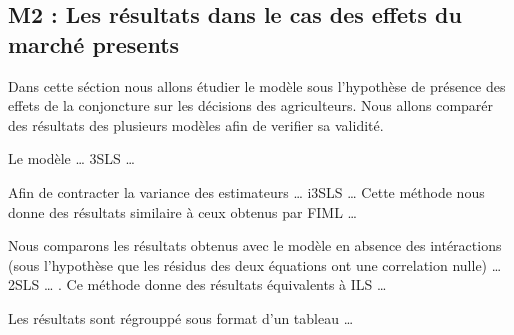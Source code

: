 \documentclass[11pt,]{article}
\begin{document}
\FloatBarrier

\hypertarget{m2-les-resultats-dans-le-cas-des-effets-du-marche-presents}{%
\subsection{M2 : Les résultats dans le cas des effets du marché
presents}\label{m2-les-resultats-dans-le-cas-des-effets-du-marche-presents}}

Dans cette séction nous allons étudier le modèle sous l'hypothèse de
présence des effets de la conjoncture sur les décisions des
agriculteurs. Nous allons comparér des résultats des plusieurs modèles
afin de verifier sa validité.

Le modèle \ldots{} 3SLS \ldots{}

Afin de contracter la variance des estimateurs \ldots{} i3SLS \ldots{}
Cette méthode nous donne des résultats similaire à ceux obtenus par FIML
\ldots{}

Nous comparons les résultats obtenus avec le modèle en absence des
intéractions (sous l'hypothèse que les résidus des deux équations ont
une correlation nulle) \ldots{} 2SLS \ldots{} . Ce méthode donne des
résultats équivalents à ILS \ldots{}

Les résultats sont régrouppé sous format d'un tableau \ldots{}

\FloatBarrier
\end{document}

